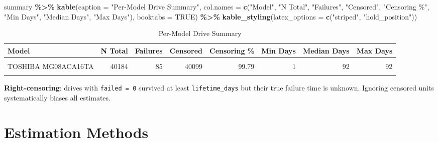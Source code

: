 \documentclass[
]{article}
\newenvironment{Shaded}{\begin{snugshade}}{\end{snugshade}}
\newcommand{\AttributeTok}[1]{\textcolor[rgb]{0.13,0.29,0.53}{#1}}
\newcommand{\ConstantTok}[1]{\textcolor[rgb]{0.56,0.35,0.01}{#1}}
\newcommand{\FunctionTok}[1]{\textcolor[rgb]{0.13,0.29,0.53}{\textbf{#1}}}
\newcommand{\NormalTok}[1]{#1}
\newcommand{\SpecialCharTok}[1]{\textcolor[rgb]{0.81,0.36,0.00}{\textbf{#1}}}
\newcommand{\StringTok}[1]{\textcolor[rgb]{0.31,0.60,0.02}{#1}}
\begin{document}
\begin{Shaded}
\begin{Highlighting}[]
\NormalTok{summary }\SpecialCharTok{\%\textgreater{}\%}
  \FunctionTok{kable}\NormalTok{(}\AttributeTok{caption =} \StringTok{"Per{-}Model Drive Summary"}\NormalTok{,}
        \AttributeTok{col.names =} \FunctionTok{c}\NormalTok{(}\StringTok{"Model"}\NormalTok{, }\StringTok{"N Total"}\NormalTok{, }\StringTok{"Failures"}\NormalTok{, }\StringTok{"Censored"}\NormalTok{,}
                      \StringTok{"Censoring \%"}\NormalTok{, }\StringTok{"Min Days"}\NormalTok{, }\StringTok{"Median Days"}\NormalTok{, }\StringTok{"Max Days"}\NormalTok{),}
        \AttributeTok{booktabs =} \ConstantTok{TRUE}\NormalTok{) }\SpecialCharTok{\%\textgreater{}\%}
  \FunctionTok{kable\_styling}\NormalTok{(}\AttributeTok{latex\_options =} \FunctionTok{c}\NormalTok{(}\StringTok{"striped"}\NormalTok{, }\StringTok{"hold\_position"}\NormalTok{))}
\end{Highlighting}
\end{Shaded}

\begin{longtable}[t]{lrrrrrrr}
\caption{\label{tab:data-summary}Per-Model Drive Summary}\\
\toprule
Model & N Total & Failures & Censored & Censoring \% & Min Days & Median Days & Max Days\\
\midrule
\cellcolor{gray!10}{TOSHIBA MG07ACA14TA} & \cellcolor{gray!10}{37463} & \cellcolor{gray!10}{116} & \cellcolor{gray!10}{37347} & \cellcolor{gray!10}{99.69} & \cellcolor{gray!10}{1} & \cellcolor{gray!10}{92} & \cellcolor{gray!10}{92}\\
TOSHIBA MG08ACA16TA & 40184 & 85 & 40099 & 99.79 & 1 & 92 & 92\\
\cellcolor{gray!10}{WDC WUH722222ALE6L4} & \cellcolor{gray!10}{40271} & \cellcolor{gray!10}{50} & \cellcolor{gray!10}{40221} & \cellcolor{gray!10}{99.88} & \cellcolor{gray!10}{1} & \cellcolor{gray!10}{92} & \cellcolor{gray!10}{92}\\
\bottomrule
\end{longtable}

\textbf{Right-censoring}: drives with \texttt{failed\ =\ 0} survived at
least \texttt{lifetime\_days} but their true failure time is unknown.
Ignoring censored units systematically biases all estimates.

\section{Estimation Methods}\label{estimation-methods}
\end{document}
